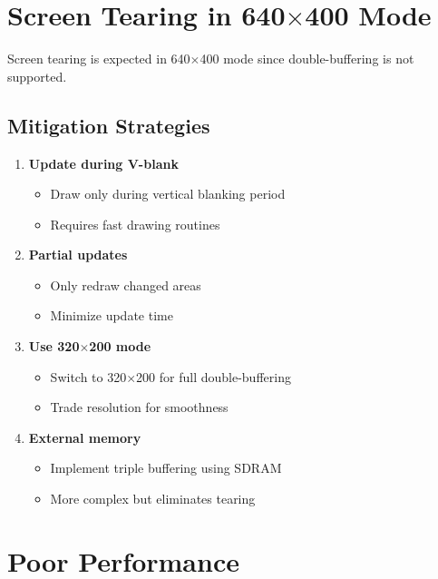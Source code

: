 \documentclass[11pt,letterpaper]{report}
\begin{document}
\section{Screen Tearing in 640$\times$400 Mode}

Screen tearing is expected in 640$\times$400 mode since double-buffering is not supported.

\subsection{Mitigation Strategies}

\begin{enumerate}
    \item \textbf{Update during V-blank}
    \begin{itemize}
        \item Draw only during vertical blanking period
        \item Requires fast drawing routines
    \end{itemize}
    
    \item \textbf{Partial updates}
    \begin{itemize}
        \item Only redraw changed areas
        \item Minimize update time
    \end{itemize}
    
    \item \textbf{Use 320$\times$200 mode}
    \begin{itemize}
        \item Switch to 320$\times$200 for full double-buffering
        \item Trade resolution for smoothness
    \end{itemize}
    
    \item \textbf{External memory}
    \begin{itemize}
        \item Implement triple buffering using SDRAM
        \item More complex but eliminates tearing
    \end{itemize}
\end{enumerate}

\section{Poor Performance}
\end{document}
